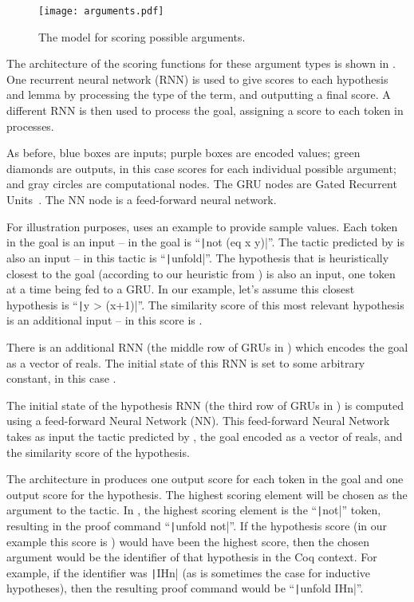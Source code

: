 \documentclass[sigplan,screen]{acmart}
\newcommand{\coqinline}[1]{\texttt|#1|}
\renewcommand{\>}{\quad}
\begin{document}
\begin{figure}
\texttt{[image: arguments.pdf]}
\caption{The model for scoring possible arguments.}
\label{fig:arguments}
\end{figure}

The architecture of the scoring functions for these argument types is shown in .
One recurrent neural network (RNN) is used to give scores to each hypothesis and lemma
  by processing the type of the term, and outputting a final score.
A different RNN is then used to process the goal, assigning a score to each token in processes.

As before, blue boxes are inputs; purple boxes are encoded values; green diamonds are outputs, in this case scores for each individual possible argument; and gray circles are computational nodes.
The GRU nodes are Gated Recurrent Units~\cite{gru}.
The NN node is a feed-forward neural network.

For illustration purposes,  uses an example to provide sample values.
Each token in the goal is an input -- in  the goal is ``\coqinline{not (eq x y)}''.
The tactic predicted by  is also an input -- in  this tactic is ``\coqinline{unfold}''.
The hypothesis that is heuristically closest to the goal
  (according to our heuristic from ) is also an input,
  one token at a time being fed to a GRU.
In our example,
  let's assume this closest hypothesis is ``\coqinline{y > (x+1)}''.
The similarity score of this most relevant hypothesis is an additional input --
  in  this score is .

There is an additional RNN (the middle row of GRUs in ) which encodes the goal as a vector of reals.
The initial state of this RNN is set to some arbitrary constant, in this case .

The initial state of the hypothesis RNN (the third row of GRUs in ) is computed using a feed-forward Neural Network (NN).
This feed-forward Neural Network takes as input the tactic predicted by , the goal encoded as a vector of reals, and the similarity score of the hypothesis.

The architecture in  produces one output score for each token in the goal and one output score for the hypothesis.
The highest scoring element will be chosen as the argument to the tactic.
In , the highest scoring element is the ``\coqinline{not}'' token, resulting in the proof command ``\coqinline{unfold not}''.
If the hypothesis score (in our example this score is ) would have been the highest score, then the chosen argument would be the identifier of that hypothesis in the Coq context.
For example, if the identifier was \coqinline{IHn} (as is sometimes the case for inductive hypotheses), then the resulting proof command would be ``\coqinline{unfold IHn}''.
\end{document}
